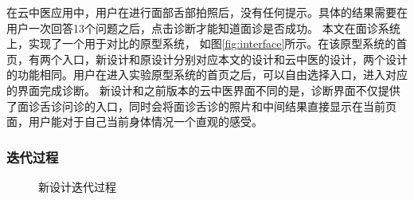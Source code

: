 在云中医应用中，用户在进行面部舌部拍照后，没有任何提示。具体的结果需要在用户一次回答13个问题之后，点击诊断才能知道面诊是否成功。
本文在面诊系统上，实现了一个用于对比的原型系统， 如图\ref{fig:interface}所示。在该原型系统的首页，有两个入口，新设计和原设计分别对应本文的设计和云中医的设计，两个设计的功能相同。用户在进入实验原型系统的首页之后，可以自由选择入口，进入对应的界面完成诊断。
新设计和之前版本的云中医界面不同的是，诊断界面不仅提供了面诊舌诊问诊的入口，同时会将面诊舌诊的照片和中间结果直接显示在当前页面，用户能对于自己当前身体情况一个直观的感受。

\subsubsection{迭代过程}
\begin{figure}[h]
    \centering
    \caption{新设计迭代过程}
    \label{fig:diag_new}
\end{figure}
